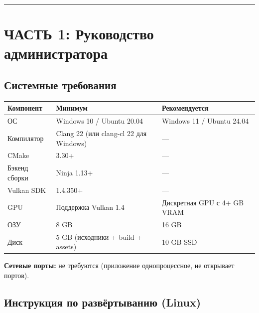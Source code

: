 
\begin{center}\rule{0.5\linewidth}{0.5pt}\end{center}

\section{ЧАСТЬ 1: Руководство администратора}\label{KT-3.1_User_Guide-ux447ux430ux441ux442ux44c-1-ux440ux443ux43aux43eux432ux43eux434ux441ux442ux432ux43e-ux430ux434ux43cux438ux43dux438ux441ux442ux440ux430ux442ux43eux440ux430}

\subsection{Системные требования}\label{KT-3.1_User_Guide-ux441ux438ux441ux442ux435ux43cux43dux44bux435-ux442ux440ux435ux431ux43eux432ux430ux43dux438ux44f}

\begin{longtable}[]{@{}lll@{}}
\toprule\noalign{}
Компонент & Минимум & Рекомендуется \\
\midrule\noalign{}
\endhead
\bottomrule\noalign{}
\endlastfoot
ОС & Windows 10 / Ubuntu 20.04 & Windows 11 / Ubuntu 24.04 \\
Компилятор & Clang 22 (или clang-cl 22 для Windows) & --- \\
CMake & 3.30+ & --- \\
Бэкенд сборки & Ninja 1.13+ & --- \\
Vulkan SDK & 1.4.350+ & --- \\
GPU & Поддержка Vulkan 1.4 & Дискретная GPU с 4+ GB VRAM \\
ОЗУ & 8 GB & 16 GB \\
Диск & 5 GB (исходники + build + assets) & 10 GB SSD \\
\end{longtable}

\textbf{Сетевые порты:} не требуются (приложение однопроцессное, не открывает портов).

\subsection{Инструкция по развёртыванию (Linux)}\label{KT-3.1_User_Guide-ux438ux43dux441ux442ux440ux443ux43aux446ux438ux44f-ux43fux43e-ux440ux430ux437ux432ux451ux440ux442ux44bux432ux430ux43dux438ux44e-linux}

